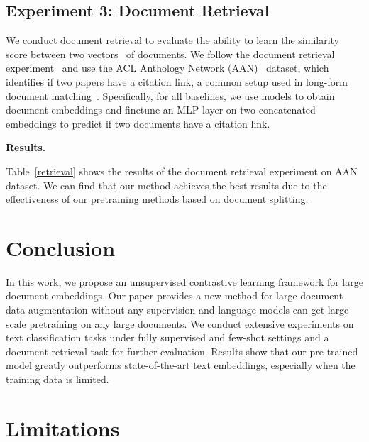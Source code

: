 \documentclass[11pt]{article}
\newcommand{\our}{\mbox{\textsc{DocSplit}}}
\begin{document}
\subsection{Experiment 3: Document Retrieval}
We conduct document retrieval to evaluate the ability to learn the similarity score between two vectors~\cite{Guo2016ADR} of documents. We follow the document retrieval experiment~\cite{Tay2020LongRA} and use the ACL Anthology Network (AAN)~\cite{Radev2009TheAA} dataset, which identifies if two papers have a citation link, a common setup used in long-form document matching~\cite{Jiang2019SemanticTM,Yang2020Beyond5T}.
Specifically, for all baselines, we use models to obtain document embeddings and finetune an MLP layer on two concatenated embeddings to predict if two documents have a citation link.

\textbf{Results.} 
\begin{table}
    \centering
    
    \caption{}
    \vspace{-3mm}
    \label{retrieval}
\end{table}
Table~\ref{retrieval} shows the results of the document retrieval experiment on AAN dataset.
We can find that our method achieves the best results due to the effectiveness of our pretraining methods based on document splitting.

\section{Conclusion}
\label{sec:conclusion}
In this work, we propose an unsupervised contrastive learning framework for large document embeddings. 
Our paper provides a new method for large document data augmentation without any supervision and language models can get large-scale pretraining on any large documents. 
We conduct extensive experiments on text classification tasks under fully supervised and few-shot settings and a document retrieval task for further evaluation.
Results show that our pre-trained model greatly outperforms state-of-the-art text embeddings, especially when the training data is limited.

\section*{Limitations}

\end{document}

